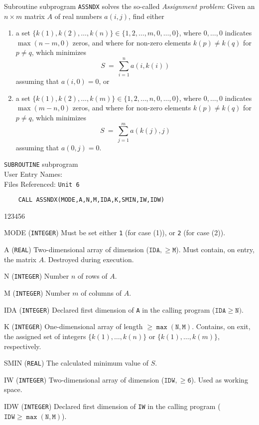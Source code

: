                            
                       
                 
                          \Revised{}
Subroutine subprogram {\tt ASSNDX} solves the so-called
{\it Assignment problem}:
Given an $n \times m$ matrix $A$ of real numbers $a(i,j)$, find either
\begin{enumerate}
\item a set
$\{k(1),k(2),\ldots,k(n)\} \in \{1,2,\ldots,m,0,\ldots,0\}$,
where $0,\ldots,0$ indicates $\max(n-m,0)$ zeros, and where for
non-zero elements $k(p) \ne k(q)$ for $p \ne q$, which minimizes
$$ S \ = \ \sum_{i=1}^n a(i,k(i))$$
assuming that $a(i,0)=0$, or
\item a set
$\{k(1),k(2),\ldots,k(m)\} \in \{1,2,\ldots,n,0,\ldots,0\}$,
where $0,\ldots,0$ indicates $\max(m-n,0)$ zeros, and where for
non-zero elements $k(p) \ne k(q)$ for $p \ne q$, which minimizes
$$ S \ = \ \sum_{j=1}^m a(k(j),j)$$
assuming that $a(0,j)=0$.
\end{enumerate}
\Structure
{\tt SUBROUTINE} subprogram \\
User Entry Names:  \\
Files Referenced: {\tt Unit 6}
\Usage
\begin{verbatim}
    CALL ASSNDX(MODE,A,N,M,IDA,K,SMIN,IW,IDW)
\end{verbatim}
\begin{DLtt}{123456}
\item [MODE] ({\tt INTEGER}) Must be set either {\tt 1} (for case (1)),
or {\tt 2} (for case (2)).
\item[A] ({\tt REAL}) Two-dimensional array of dimension
($\mathtt{IDA,\ge M}$). Must contain, on entry,
the matrix $A$. Destroyed during execution.
\item[N]({\tt INTEGER}) Number $n$ of rows of $A$.
\item[M]({\tt INTEGER}) Number $m$ of columns of $A$.
\item [IDA]({\tt INTEGER}) Declared first dimension of {\tt A}
in the calling program ($\mathtt{IDA \ge N})$.
\item[K] ({\tt INTEGER}) One-dimensional array of length
$\mathtt{\ge \max(N,M)}$. Contains, on exit, the assigned set of
integers $\{k(1),\ldots,k(n)\}$ or $\{k(1),\ldots,k(m)\}$,
respectively.
\item [SMIN] ({\tt REAL}) The calculated minimum value of $S$.
\item[IW] ({\tt INTEGER}) Two-dimensional array of dimension
($\mathtt{IDW,\ge 6}$). Used as working space.
\item [IDW]({\tt INTEGER}) Declared first dimension of {\tt IW}
in the calling program ($\mathtt{IDW \ge \max(N,M)}$).
\end{DLtt}

